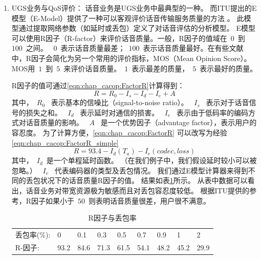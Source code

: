 \begin{enumerate}[(1)]
    \item UGS业务与QoS评价：
        话音业务是UGS业务中最典型的一种。
        而ITU提出的E模型（E-Model）提供了一种可以客观评价话音传输服务质量的方法 \cite{ITU:G107}。
        此模型通过提取网络参数（如延时或丢包）定义了对话音评估的分析模型。
        E模型可以使用R因子（R-factor）来评价话音质量。一般，R因子的值域在~$0$~到~$100$~之间。
        ~$0$~表示话音质量最差；~$100$~表示话音质量最好。在有些文献中，R因子会简化为另一个常用的评价指标，MOS（Mean Opinion Score）。
        MOS用~$1$~到~$5$~来评价话音质量。~$1$~表示最差的质量，~$5$~表示最好的质量\cite{NK:IEICE:2005}。

        R因子的值可通过\eqref{eqn:chap_cacop:FactorR}计算得到：
\begin{equation}
\label{eqn:chap_cacop:FactorR}
R = R_0 − I_s − I_d − I_e + A 
\end{equation}
其中，~$R_0$~ 表示基本的信噪比（signal-to-noise ratio）。
~$I_s$~ 表示对于话音信号的损失之和。
~$I_d$~ 表示延时对通信的损害。
~$I_e$~ 表示由于低码率的编码方式对话音质量的影响。
~$A$~ 是一个优势因子（advantage factor），表示用户的容忍度。
为了计算方便，\eqref{eqn:chap_cacop:FactorR} 可以改写为经验\eqref{eqn:chap_cacop:FactorR_simple}
\begin{equation}
R = 93. 4 - I_d ( T_a ) -I_e ( codec, loss )
\label{eqn:chap_cacop:FactorR_simple}
\end{equation}
其中，~$I_d$~是一个单程延时函数。
（在我们例子中，我们假设延时较小可以被忽略。）
~$I_e$~ 代表编码器的类型及丢包情况。
我们通过E模型计算器来得到不同的丢包状况下的话音质量R因子的值\cite{ITU:EModel:Caculator}。 
结果如表\ref{tb:R_factor}所示。
从表中数据可以看出，话音业务对带宽资源极为敏感而且对丢包容忍度较低。
根据ITU提供的参考，R因子如果小于~$50$~则表明话音质量很差，用户很不满意。

\begin{table}[tb]
\caption{R因子与丢包率} \label{tb:R_factor}
\begin{center}
\wuhao
\begin{tabularx}{0.99\textwidth}{lXXXXXXXX}
\toprule 
丢包率(\%): & 0& 0.1& 0.3& 0.5& 0.7& 0.9& 1& 2\\
R-因子: &93.2& 84.6& 71.3& 61.5& 54.1& 48.2& 45.2& 29.9\\ 
\bottomrule
\end{tabularx}
\end{center}
\end{table}


\end{enumerate}
